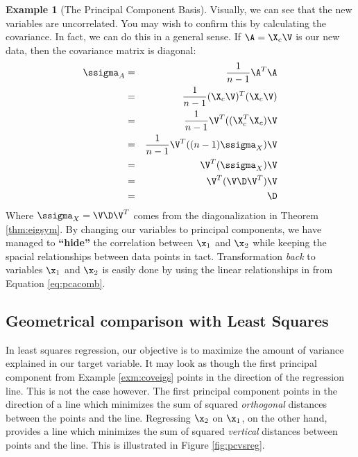 \documentclass[
]{article}
\theoremstyle{definition}
\theoremstyle{definition}
\newtheorem{example}{Example}[section]
\theoremstyle{definition}
\theoremstyle{definition}
\theoremstyle{remark}
\begin{document}
\begin{example}[The Principal Component Basis]
Visually, we can see that the new variables are uncorrelated. You may wish to confirm this by calculating the covariance. In fact, we can do this in a general sense. If \(\A=\X_c\V\) is our new data, then the covariance matrix is diagonal:
\begin{eqnarray*}
\ssigma_A &=& \frac{1}{n-1}\A^T\A  \\ 
    &=& \frac{1}{n-1}(\X_c\V)^T(\X_c\V) \\
    &=& \frac{1}{n-1}\V^T((\X_c^T\X_c)\V\\
    &=&\frac{1}{n-1}\V^T((n-1)\ssigma_X)\V\\
    &=&\V^T(\ssigma_X)\V\\
    &=&\V^T(\V\D\V^T)\V\\
    &=& \D
\end{eqnarray*}
Where \(\ssigma_X=\V\D\V^T\) comes from the diagonalization in Theorem \ref{thm:eigsym}.
By changing our variables to principal components, we have managed to \textbf{``hide''} the correlation between \(\x_1\) and \(\x_2\) while keeping the spacial relationships between data points in tact. Transformation \emph{back} to variables \(\x_1\) and \(\x_2\) is easily done by using the linear relationships in from Equation \eqref{eq:pcacomb}.

\end{example}

\hypertarget{geometrical-comparison-with-least-squares}{%
\subsection{Geometrical comparison with Least Squares}\label{geometrical-comparison-with-least-squares}}

In least squares regression, our objective is to maximize the amount of variance explained in our target variable. It may look as though the first principal component from Example \ref{exm:coveigs} points in the direction of the regression line. This is not the case however. The first principal component points in the direction of a line which minimizes the sum of squared \emph{orthogonal} distances between the points and the line. Regressing \(\x_2\) on \(\x_1\), on the other hand, provides a line which minimizes the sum of squared \emph{vertical} distances between points and the line. This is illustrated in Figure \ref{fig:pcvsreg}.
\end{document}
